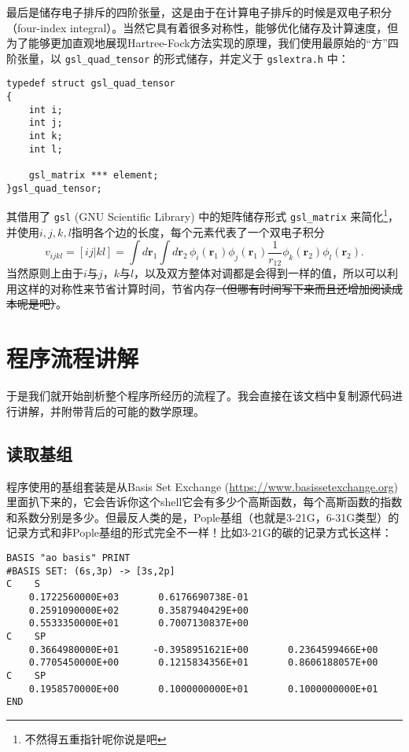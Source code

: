 \documentclass[12pt,a4paper,openany,twoside]{article}
\numberwithin{equation}{section}
\begin{document}
        最后是储存电子排斥的四阶张量，这是由于在计算电子排斥的时候是双电子积分（four-index integral）。当然它具有着很多对称性，能够优化储存及计算速度，但为了能够更加直观地展现Hartree-Fock方法实现的原理，我们使用最原始的``方''四阶张量，以 \lstinline$gsl_quad_tensor$ 的形式储存，并定义于 \lstinline$gslextra.h$ 中：
        \begin{lstlisting}
typedef struct gsl_quad_tensor
{
    int i;
    int j;
    int k;
    int l;

    gsl_matrix *** element;
}gsl_quad_tensor;
        \end{lstlisting}
        其借用了 \lstinline$gsl$ (GNU Scientific Library) 中的矩阵储存形式 \lstinline$gsl_matrix$ 来简化\footnote{不然得五重指针呢你说是吧}，并使用$i,j,k,l$指明各个边的长度，每个元素代表了一个双电子积分
        \begin{equation}
            v_{ijkl} = [ij|kl] = \int d\boldsymbol{r}_1 \int d\boldsymbol{r}_2 \, \phi_i(\boldsymbol{r}_1)\phi_j(\boldsymbol{r}_1) \frac{1}{r_{12}} \phi_k(\boldsymbol{r}_2)\phi_l(\boldsymbol{r}_2).
        \end{equation}
        当然原则上由于$i$与$j$，$k$与$l$，以及双方整体对调都是会得到一样的值，所以可以利用这样的对称性来节省计算时间，节省内存\sout{（但哪有时间写下来而且还增加阅读成本呢是吧）}。

        \section{程序流程讲解}
        于是我们就开始剖析整个程序所经历的流程了。我会直接在该文档中复制源代码进行讲解，并附带背后的可能的数学原理。

            \subsection{读取基组}
            程序使用的基组套装是从Basis Set Exchange \cite{schuchardt2007basis}(\url{https://www.basissetexchange.org}) 里面扒下来的，它会告诉你这个shell它会有多少个高斯函数，每个高斯函数的指数和系数分别是多少。但最反人类的是，Pople基组（也就是3-21G，6-31G类型）的记录方式和非Pople基组的形式完全不一样！比如3-21G的碳的记录方式长这样：

            \begin{lstlisting}
BASIS "ao basis" PRINT
#BASIS SET: (6s,3p) -> [3s,2p]
C    S
    0.1722560000E+03       0.6176690738E-01
    0.2591090000E+02       0.3587940429E+00
    0.5533350000E+01       0.7007130837E+00
C    SP
    0.3664980000E+01      -0.3958951621E+00       0.2364599466E+00
    0.7705450000E+00       0.1215834356E+01       0.8606188057E+00
C    SP
    0.1958570000E+00       0.1000000000E+01       0.1000000000E+01
END
            \end{lstlisting}
\end{document}
